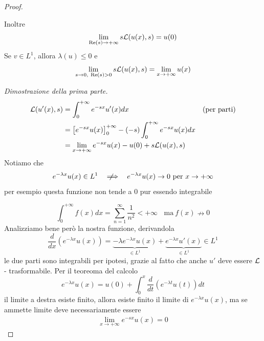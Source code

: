 \begin{proof}
\begin{thm}
Inoltre
\begin{equation*}
\lim_{\operatorname{Re} (s)\rightarrow + \infty} s\mathcal{L}(u(x), s) = u(0)
\end{equation*}
Se $v\in L^{1}$, allora $\lambda (u) \leq 0$ e
\begin{equation*}
\lim\limits_{s\rightarrow 0, \ \operatorname{Re} (s) > 0} s\mathcal{L}(u(x), s) = \lim_{x\rightarrow + \infty} u(x)
\end{equation*}
\end{thm}
\textit{Dimostrazione della prima parte.}
\begin{align*}
\mathcal{L}(u'(x), s) & = \int^{+ \infty}_{0} e^{- sx} u'(x) dx & \text{(per parti)}\\
 & = \left[e^{- sx} u(x)\right]^{+ \infty}_{0} - (- s)\int^{+ \infty}_{0} e^{- sx} u(x) dx & \\
 & = \lim_{x\rightarrow + \infty} e^{- sx} u(x) - u(0) + s\mathcal{L}(u(x), s) &
\end{align*}
Notiamo che
\begin{equation*}
e^{- \lambda x} u(x) \in L^{1} \ \ \notimplies \ \ e^{- \lambda x} u(x)\rightarrow 0\ \text{per} \ x\rightarrow + \infty
\end{equation*}
per esempio questa funzione non tende a $0$ pur essendo integrabile



\begin{equation*}
\int^{+ \infty}_{0} f(x) dx = \sum^{\infty}_{n = 1}\frac{1}{n^{2}} < + \infty \ \ \ \ \text{ma} \ f(x) \nrightarrow 0
\end{equation*}
Analizziamo bene però la nostra funzione, derivandola
\begin{equation*}
\frac{d}{dx}\left(e^{- \lambda x} u(x)\right) = \underbrace{- \lambda e^{- \lambda x} u(x)}_{\in L^{1}} + \underbrace{e^{- \lambda x} u'(x)}_{\in L^{1}} \in L^{1}
\end{equation*}
le due parti sono integrabili per ipotesi, grazie al fatto che anche $u'$ deve essere $\mathcal{L}$ - trasformabile. Per il teoreoma del calcolo
\begin{equation*}
e^{- \lambda x} u(x) = u(0) + \int^{x}_{0}\frac{d}{dt}\left(e^{- \lambda t} u(t)\right) dt
\end{equation*}
il limite a destra esiste finito, allora esiste finito il limite di $e^{- \lambda x} u(x)$, ma se ammette limite deve necessariamente essere
\begin{gather*}
\lim_{x\rightarrow + \infty} e^{- sx} u(x) = 0
\end{gather*}
\end{proof}

